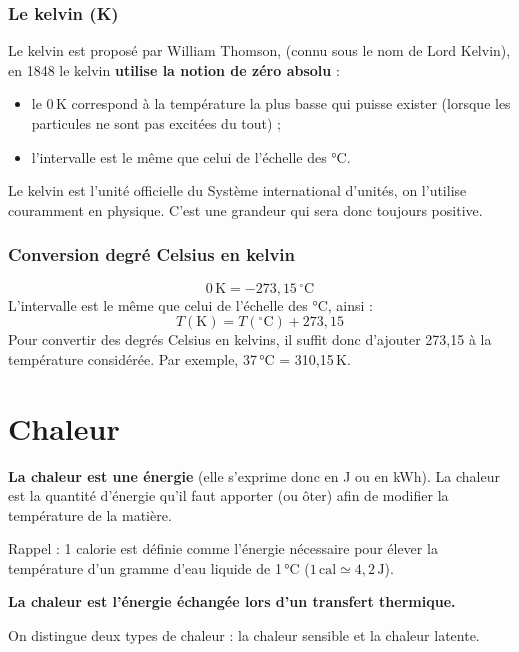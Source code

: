 \subsubsection*{Le kelvin (K)}
Le kelvin est proposé par William Thomson, (connu sous le nom de Lord Kelvin), en 1848 le kelvin \textbf{utilise la notion de zéro absolu} :
  \begin{itemize}
    \item le 0\,K correspond à la température la plus basse qui puisse exister (lorsque les particules ne sont pas excitées du tout) ;
    \item l'intervalle est le même que celui de l'échelle des °C.
  \end{itemize}
Le kelvin est l'unité officielle du Système international d'unités, on l'utilise couramment en physique. C'est une grandeur qui sera donc toujours positive.


\subsubsection*{Conversion degré Celsius en kelvin}
\[
  0\,\mathrm{K} = -273{,}15\,^{\circ}\mathrm{C}
\]
L'intervalle est le même que celui de l'échelle des °C, ainsi :
\begin{equation}
  T(\mathrm{K}) = T(^{\circ}\mathrm{C}) + 273{,}15
\end{equation}
Pour convertir des degrés Celsius en kelvins, il suffit donc d'ajouter 273,15 à la température considérée.
Par exemple, 37\,°C = 310,15\,K.

\section{Chaleur}

\textbf{La chaleur est une énergie} (elle s'exprime donc en J ou en kWh).
La chaleur est la quantité d'énergie qu'il faut apporter (ou ôter) afin de modifier la température de la matière.

Rappel : 1 calorie est définie comme l'énergie nécessaire pour élever la température d'un gramme d'eau liquide de 1\,°C ($1\,\mathrm{cal} \simeq 4{,}2\,\mathrm{J}$).

\textbf{La chaleur est l'énergie échangée lors d'un transfert thermique.}

On distingue deux types de chaleur : la chaleur sensible et la chaleur latente.

